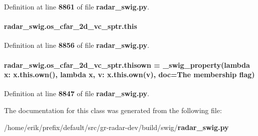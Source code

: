 Definition at line {\bf 8861} of file {\bf radar\+\_\+swig.\+py}.

\paragraph[{this}]{\setlength{\rightskip}{0pt plus 5cm}radar\+\_\+swig.\+os\+\_\+cfar\+\_\+2d\+\_\+vc\+\_\+sptr.\+this}\label{classradar__swig_1_1os__cfar__2d__vc__sptr_a4e2cd8dbe80c2c118ec0832d5325581a}


Definition at line {\bf 8856} of file {\bf radar\+\_\+swig.\+py}.

\paragraph[{thisown}]{\setlength{\rightskip}{0pt plus 5cm}radar\+\_\+swig.\+os\+\_\+cfar\+\_\+2d\+\_\+vc\+\_\+sptr.\+thisown = {\bf \+\_\+swig\+\_\+property}(lambda x\+: x.\+this.\+own(), lambda {\bf x}, v\+: x.\+this.\+own(v), doc=\textquotesingle{}The membership flag\textquotesingle{})\hspace{0.3cm}{\ttfamily [static]}}\label{classradar__swig_1_1os__cfar__2d__vc__sptr_a4b7ca9abbcd8b57babf3c91ee3b671db}


Definition at line {\bf 8847} of file {\bf radar\+\_\+swig.\+py}.



The documentation for this class was generated from the following file\+:\begin{DoxyCompactItemize}
\item 
/home/erik/prefix/default/src/gr-\/radar-\/dev/build/swig/{\bf radar\+\_\+swig.\+py}\end{DoxyCompactItemize}
